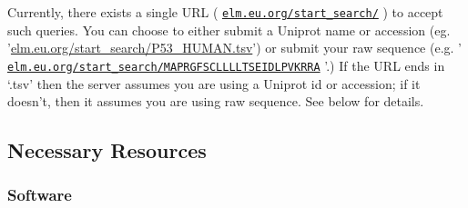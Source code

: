 \documentclass[12pt]{article}
\newcommand\rurl[1]{%
	\href{http://#1}{\nolinkurl{#1}}%
}
\begin{document}
Currently, there exists a single URL (\rurl{elm.eu.org/start\_search/})
to accept such queries. You can choose to either submit a Uniprot name
or accession (eg. '\url{elm.eu.org/start\_search/P53\_HUMAN.tsv}') or
submit your raw sequence (e.g. '\rurl{elm.eu.org/start\_search/MAPRGFSCLLLLTSEIDLPVKRRA}'.)
If the URL ends in `.tsv' then the server assumes you
are using a Uniprot id or accession; if it doesn't, then it assumes you
are using raw sequence. See below for details.

%
%
\subsection*{Necessary Resources}
\subsubsection*{Software}

\end{document}
